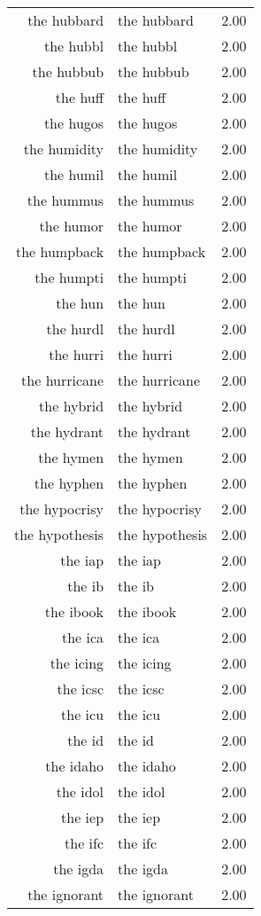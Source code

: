 \begin{table}[ht]
\begin{tabular}{rlr}
  the hubbard & the hubbard & 2.00 \\ 
  the hubbl & the hubbl & 2.00 \\ 
  the hubbub & the hubbub & 2.00 \\ 
  the huff & the huff & 2.00 \\ 
  the hugos & the hugos & 2.00 \\ 
  the humidity & the humidity & 2.00 \\ 
  the humil & the humil & 2.00 \\ 
  the hummus & the hummus & 2.00 \\ 
  the humor & the humor & 2.00 \\ 
  the humpback & the humpback & 2.00 \\ 
  the humpti & the humpti & 2.00 \\ 
  the hun & the hun & 2.00 \\ 
  the hurdl & the hurdl & 2.00 \\ 
  the hurri & the hurri & 2.00 \\ 
  the hurricane & the hurricane & 2.00 \\ 
  the hybrid & the hybrid & 2.00 \\ 
  the hydrant & the hydrant & 2.00 \\ 
  the hymen & the hymen & 2.00 \\ 
  the hyphen & the hyphen & 2.00 \\ 
  the hypocrisy & the hypocrisy & 2.00 \\ 
  the hypothesis & the hypothesis & 2.00 \\ 
  the iap & the iap & 2.00 \\ 
  the ib & the ib & 2.00 \\ 
  the ibook & the ibook & 2.00 \\ 
  the ica & the ica & 2.00 \\ 
  the icing & the icing & 2.00 \\ 
  the icsc & the icsc & 2.00 \\ 
  the icu & the icu & 2.00 \\ 
  the id & the id & 2.00 \\ 
  the idaho & the idaho & 2.00 \\ 
  the idol & the idol & 2.00 \\ 
  the iep & the iep & 2.00 \\ 
  the ifc & the ifc & 2.00 \\ 
  the igda & the igda & 2.00 \\ 
  the ignorant & the ignorant & 2.00 \\ 

\end{tabular}
\end{table}
